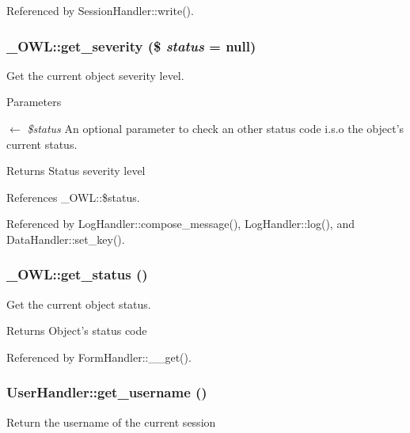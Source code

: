 Referenced by SessionHandler::write().

\subsubsection[{get\_\-severity}]{\setlength{\rightskip}{0pt plus 5cm}\_\-OWL::get\_\-severity (\$ {\em status} = {\ttfamily null})}\label{class__OWL_adf9509ef96858be7bdd9414c5ef129aa}
Get the current object severity level.


\begin{DoxyParams}{Parameters}
\item[\mbox{$\leftarrow$} {\em \$status}]An optional parameter to check an other status code i.s.o the object's current status. \end{DoxyParams}
\begin{DoxyReturn}{Returns}
Status severity level 
\end{DoxyReturn}


References \_\-OWL::\$status.



Referenced by LogHandler::compose\_\-message(), LogHandler::log(), and DataHandler::set\_\-key().

\subsubsection[{get\_\-status}]{\setlength{\rightskip}{0pt plus 5cm}\_\-OWL::get\_\-status ()}\label{class__OWL_a99ec771fa2c5c279f80152cc09e489a8}
Get the current object status.

\begin{DoxyReturn}{Returns}
Object's status code 
\end{DoxyReturn}


Referenced by FormHandler::\_\-\_\-get().

\subsubsection[{get\_\-username}]{\setlength{\rightskip}{0pt plus 5cm}UserHandler::get\_\-username ()}\label{classUserHandler_a76e8c8b88c8d92f2d03645e810b9253c}
Return the username of the current session 

